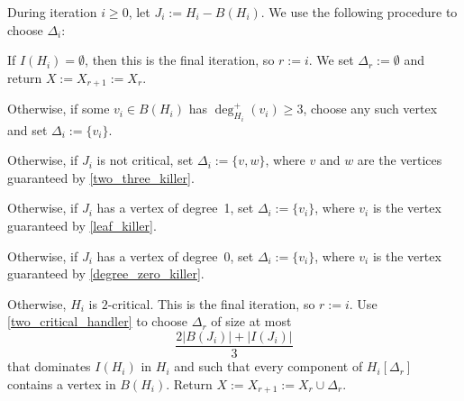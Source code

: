 \documentclass{patmorin}
\begin{document}
During iteration $i\ge 0$, let $J_i:=H_i-B(H_i)$. We use the following procedure to choose $\Delta_i$:
\begin{enumerate}[label={[bg\arabic*]},labelwidth=\widthof{[bg0]},leftmargin=!,nosep,nolistsep] 
    \item If $I(H_i)=\emptyset$, then this is the final iteration, so $r:=i$. We set $\Delta_r:=\emptyset$ and return $X:=X_{r+1}:=X_r$.\label{bg_empty}
    \item Otherwise, if some $v_i\in B(H_i)$ has $\deg^+_{H_i}(v_i)\ge3$, choose any such vertex and set $\Delta_i:=\{v_i\}$.  
    \label{bg_high_degree}
    \item Otherwise, if $J_i$ is not critical, set $\Delta_i:=\{v,w\}$, where $v$ and $w$ are the vertices guaranteed by \cref{two_three_killer}.  
    \label{bg_two_three}
    \item Otherwise, if $J_i$ has a vertex of degree~1, set $\Delta_i:=\{v_i\}$, where $v_i$ is the vertex guaranteed by \cref{leaf_killer}.
    \label{bg_leaf}
    \item Otherwise, if $J_i$ has a vertex of degree~0, set $\Delta_i:=\{v_i\}$, where $v_i$ is the vertex guaranteed by \cref{degree_zero_killer}.  
    \label{bg_degree_zero}
    \item Otherwise, $H_i$ is $2$-critical. This is the final iteration, so $r:=i$. Use \cref{two_critical_handler} to choose $\Delta_r$ of size at most
    \[
      \frac{2|B(J_i)|+|I(J_i)|}{3}
    \]
    that dominates $I(H_i)$ in $H_i$ and such that every component of $H_i[\Delta_r]$ contains a vertex in $B(H_i)$.  Return $X:=X_{r+1}:=X_r\cup\Delta_r$.
    \label{bg_two_critical}
\end{enumerate}
\end{document}
